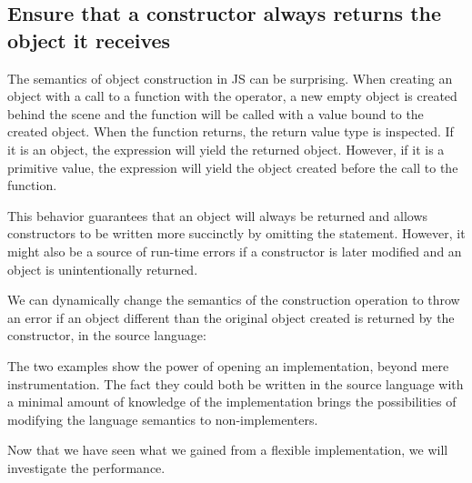\subsection{Ensure that a constructor always returns the object it receives}

The semantics of object construction in JS can be surprising. When creating an
object with a call to a function with the  operator, a new empty object
is created behind the scene and the function will be called with a 
value bound to the created object. When the function returns, the return value type 
is inspected. If it is an object, the  expression will yield the
returned object. However, if it is a primitive value, the  expression
will yield the object created before the call to the function.

This behavior guarantees that an object will always be returned and allows
constructors to be written more succinctly by omitting the 
statement. However, it might also be a source of run-time errors if a
constructor is later modified and an object is unintentionally returned.

We can dynamically change the semantics of the construction operation to throw
an error if an object different than the original object created is returned by
the constructor, in the source language:


The two examples show the power of opening an implementation, beyond mere
instrumentation. The fact they could both be written in the source language
with a minimal amount of knowledge of the implementation brings the
possibilities of modifying the language semantics to non-implementers.

Now that we have seen what we gained from a flexible implementation, we will
investigate the performance.
